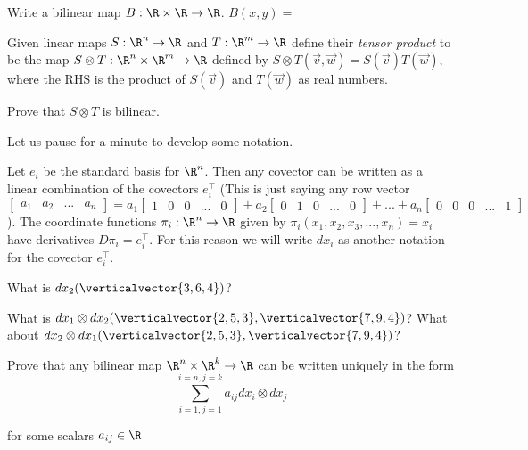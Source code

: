 	\begin{question}
		Write a bilinear map  $B: \R \times \R \to \R$.  $B(x,y) = $
	\end{question}

	\begin{question}
		Given linear maps $S : \R^n \to \R$ and $T:\R^m \to \R$ define their \textit{tensor product} to be the map 
		$S \otimes T: \R^n \times \R^m \to \R$ defined by $S \otimes T(\vec{v},\vec{w}) = S(\vec{v}) T(\vec{w})$, where 
		the RHS is the product of $S(\vec{v})$ and $T(\vec{w})$  as real numbers.
		
		Prove that $S \otimes T$ is bilinear.
	\end{question}
	
	Let us pause for a minute to develop some notation.
	
	Let $e_i$ be the standard basis for $\R^n$.  Then any covector can be written as a linear combination of the covectors $e_i^\top$ (This is just saying any row 
	vector $\begin{bmatrix} a_1 & a_2  &... &a_n\end{bmatrix} = a_1\begin{bmatrix} 1& 0&0&...&0\end{bmatrix} + a_2\begin{bmatrix} 0& 1&0&...&0\end{bmatrix} 
	+ ... + a_n \begin{bmatrix} 0& 0&0&...&1\end{bmatrix}$).   The coordinate functions $\pi_i:\R^n \to \R$ given by $\pi_i (x_1,x_2,x_3,...,x_n) = x_i$ have 
	derivatives $D\pi_i = e_i^\top$.  For this reason we will write $dx_i$ as another notation for the covector $e_i^\top$.
	
	\begin{question}
		What is $dx_2(\verticalvector{3,6,4})$?
	\end{question}
	
	\begin{question}
		What is $dx_1 \otimes dx_2 (\verticalvector{2,5,3},\verticalvector{7,9,4})$?  What about $dx_2 \otimes dx_1(\verticalvector{2,5,3},\verticalvector{7,9,4})$?
	\end{question}
	
	\begin{question}
		Prove that any bilinear map $\R^n \times \R^k \to \R$ can be written uniquely in the form 
		\[
			\sum_{i=1,j=1}^{i=n,j=k} a_{ij} dx_i \otimes dx_j
		\]
		
		for some scalars $a_{ij} \in \R$
	\end{question}
	
